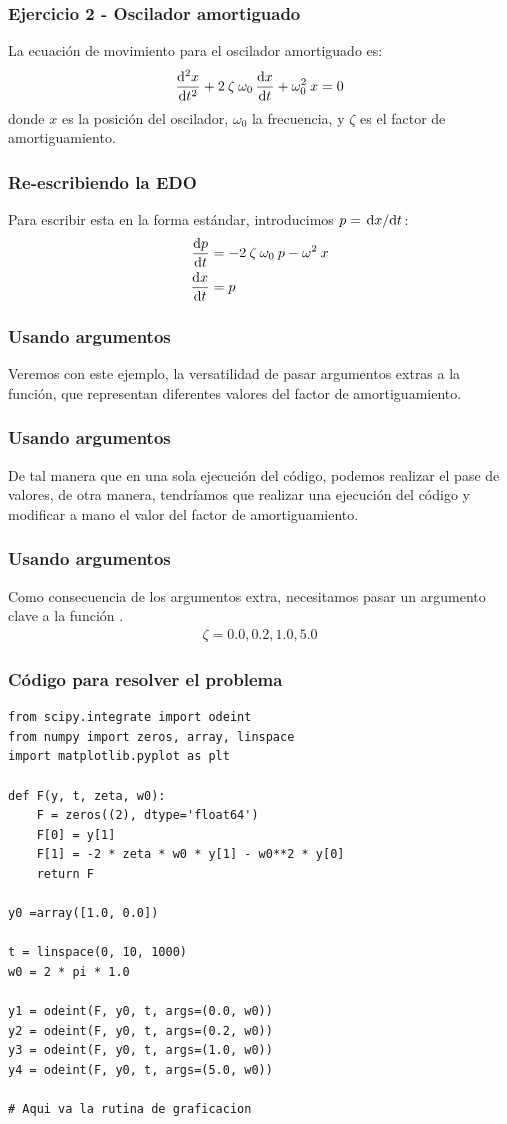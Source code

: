 \documentclass[12pt]{beamer}
\begin{document}
\begin{frame}
\frametitle{Ejercicio 2 - Oscilador amortiguado}
La ecuación de movimiento para el oscilador amortiguado es:
\pause
\begin{align*}
\dv[2]{x}{t} + 2 \: \zeta \:  \omega_{0} \, \dv{x}{t} + \omega_{0}^{2} \: x = 0
\end{align*}
donde $x$ es la posición del oscilador, $\omega_{0}$ la frecuencia, y $\zeta$ es el factor de amortiguamiento.
\end{frame}
\begin{frame}
\frametitle{Re-escribiendo la EDO}
Para escribir esta  en la forma estándar, introducimos $p = \dv*{x}{t}$:
\pause
\begin{align*}
\dv{p}{t} &= - 2 \: \zeta \: \omega_{0} \: p - \omega^{2} \: x \\
\dv{x}{t} &= p
\end{align*}
\end{frame}
\begin{frame}
\frametitle{Usando argumentos}
Veremos con este ejemplo, la versatilidad de pasar argumentos extras a la función, que representan diferentes valores del factor de amortiguamiento.
\end{frame}
\begin{frame}
\frametitle{Usando argumentos}
De tal manera que en una sola ejecución del código, podemos realizar el pase de valores, de otra manera, tendríamos que realizar una ejecución del código y modificar a mano el valor del factor de amortiguamiento.
\end{frame}
\begin{frame}
\frametitle{Usando argumentos}
Como consecuencia de los argumentos extra, necesitamos pasar un argumento clave  a la función .
\\
\bigskip
\pause
\begin{align*}
\zeta = 0.0, 0.2, 1.0, 5.0
\end{align*}
\end{frame}
\begin{frame}
\frametitle{Código para resolver el problema}
\begin{lstlisting}[caption=Código completo para el oscilador amortiguado]
from scipy.integrate import odeint
from numpy import zeros, array, linspace
import matplotlib.pyplot as plt

def F(y, t, zeta, w0):
    F = zeros((2), dtype='float64')
    F[0] = y[1]
    F[1] = -2 * zeta * w0 * y[1] - w0**2 * y[0]
    return F    

y0 =array([1.0, 0.0])

t = linspace(0, 10, 1000)
w0 = 2 * pi * 1.0

y1 = odeint(F, y0, t, args=(0.0, w0))
y2 = odeint(F, y0, t, args=(0.2, w0))
y3 = odeint(F, y0, t, args=(1.0, w0))
y4 = odeint(F, y0, t, args=(5.0, w0))

# Aqui va la rutina de graficacion
\end{lstlisting}
\end{frame}
\end{document}
